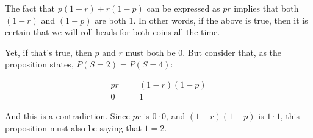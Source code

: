 \documentclass[a4paper]{article}
\begin{document}
The fact that $p(1-r) + r(1-p)$ can be expressed as $pr$ implies that both $(1-r)$ and $(1-p)$ are both 1. In other words, if the above is true, then it is certain that we will roll heads for both coins all the time.

Yet, if that's true, then $p$ and $r$ must both be 0. But consider that, as the proposition states, $P(S=2) = P(S=4)$:

\begin{equation}
\begin{array}{rcl}
pr & = & (1-r)(1-p) \\
0 & = & 1
\end{array}
\end{equation}

And this is a contradiction. Since $pr$ is $0 \cdot 0$, and $(1-r)(1-p)$ is $1 \cdot 1$, this proposition must also be saying that $1 = 2$.
\end{document}
